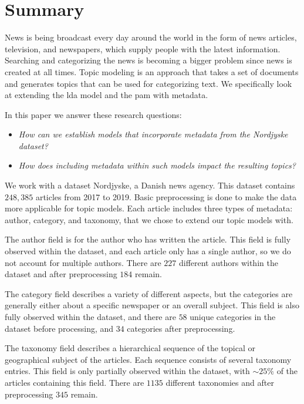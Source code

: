\section*{Summary}
News is being broadcast every day around the world in the form of news articles, television, and newspapers, which supply people with the latest information.
Searching and categorizing the news is becoming a bigger problem since news is created at all times.
Topic modeling is an approach that takes a set of documents and generates topics that can be used for categorizing text.
We specifically look at extending the \gls{lda} model and the \gls{pam} with metadata.

In this paper we answer these research questions:
\begin{itemize}
	\item \textit{How can we establish models that incorporate metadata from the Nordjyske dataset?}
	\item \textit{How does including metadata within such models impact the resulting topics?}
\end{itemize}

We work with a dataset Nordjyske, a Danish news agency.
This dataset contains $248,385$ articles from 2017 to 2019.
Basic preprocessing is done to make the data more applicable for topic models.
Each article includes three types of metadata: author, category, and taxonomy, that we chose to extend our topic models with.

The author field is for the author who has written the article.
This field is fully observed within the dataset, and each article only has a single author, so we do not account for multiple authors.
There are $227$ different authors within the dataset and after preprocessing $184$ remain.

The category field describes a variety of different aspects, but the categories are generally either about a specific newspaper or an overall subject.
This field is also fully observed within the dataset, and there are $58$ unique categories in the dataset before processing, and $34$ categories after preprocessing.

The taxonomy field describes a hierarchical sequence of the topical or geographical subject of the articles.
Each sequence consists of several taxonomy entries.
This field is only partially observed within the dataset, with ${\sim}25\%$ of the articles containing this field.
There are $1135$ different taxonomies and after preprocessing $345$ remain.

